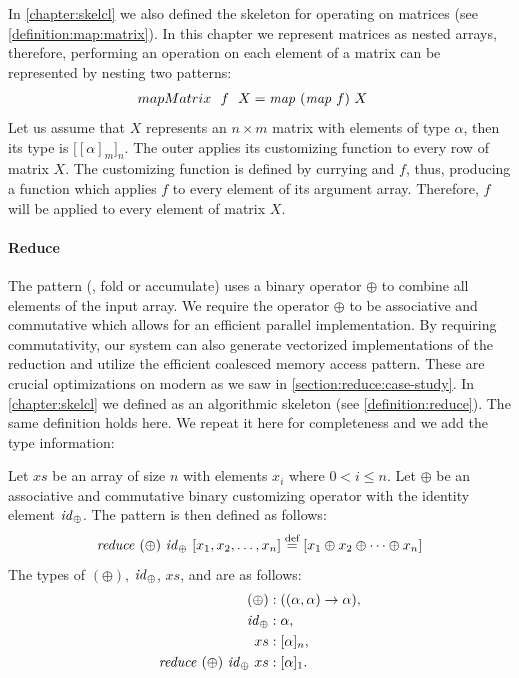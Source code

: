 \noindent
In \autoref{chapter:skelcl} we also defined the \map skeleton for operating on matrices (see \autoref{definition:map:matrix}).
In this chapter we represent matrices as nested arrays, therefore, performing an operation on each element of a matrix can be represented by nesting two \map patterns:
\begin{align*}
  mapMatrix\ \ f\ \ X &= \text{\textit{map}}\ (\text{\textit{map}}\ f)\ X
\end{align*}
Let us assume that $X$ represents an $n\times m$ matrix with elements of type $\alpha$, then its type is $\big[[\alpha]_m\big]_n$.
The outer \map applies its customizing function to every row of matrix $X$.
The customizing function is defined by currying \map and $f$, thus, producing a function which applies $f$ to every element of its argument array.
Therefore, $f$ will be applied to every element of matrix $X$.

\paragraph{Reduce}
The \reduce pattern (\aka, fold or accumulate) uses a binary operator $\oplus$ to combine all elements of the input array.
We require the operator $\oplus$ to be associative and commutative which allows for an efficient parallel implementation.
By requiring commutativity, our system can also generate vectorized implementations of the reduction and utilize the efficient coalesced memory access pattern.
These are crucial optimizations on modern \GPUs as we saw in \autoref{section:reduce:case-study}.
In \autoref{chapter:skelcl} we defined \reduce as an algorithmic skeleton (see \autoref{definition:reduce}).
The same definition holds here.
We repeat it here for completeness and we add the type information:
\begin{definition}
  \label{definition:pattern:reduce}
  Let $xs$ be an array of size $n$ with elements $x_i$ where $0 < i \leq n$.
  Let $\oplus$ be an associative and commutative binary customizing operator with the identity element $\text{\textit{id}}_\oplus$.
  The \reduce pattern is then defined as follows:
  \begin{equation*}
    \text{\textit{reduce}}\ (\oplus)\ \text{\textit{id}}_\oplus\ [x_1, x_2, \dots, x_n]
      \stackrel{\textrm{\scriptsize def}}{=} [x_1 \oplus x_2 \oplus \dots \oplus x_n]
  \end{equation*}
  The types of $(\oplus)$, $\text{\textit{id}}_\oplus$, $xs$, and \reduce are as follows:
  \begin{align*}
    (\oplus) &: ((\alpha, \alpha) \rightarrow \alpha),\\
    \text{\textit{id}}_\oplus &: \alpha,\\
    xs &: [\alpha]_n,\\
    \text{\textit{reduce}}\ (\oplus)\ \text{\textit{id}}_\oplus\ xs &: [\alpha]_1 .
  \end{align*}
\end{definition}


